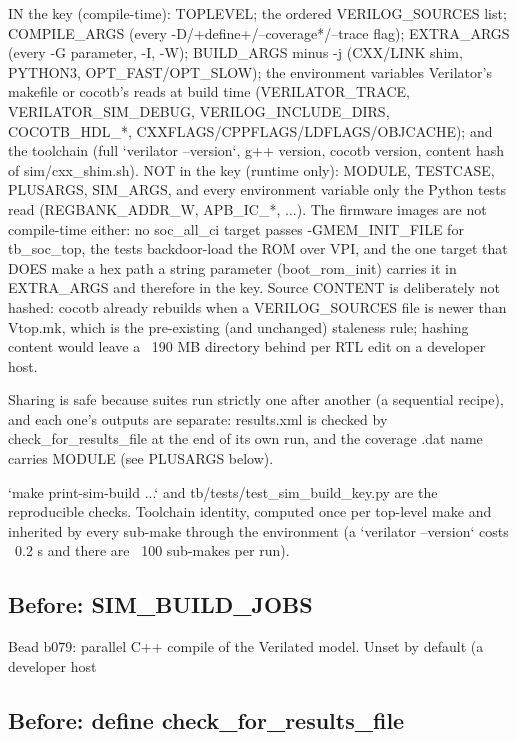 \begin{record}
\begin{textblock}
IN the key (compile-time): TOPLEVEL; the ordered VERILOG_SOURCES list; COMPILE_ARGS (every
  -D/+define+/--coverage*/--trace flag); EXTRA_ARGS (every -G parameter, -I, -W); BUILD_ARGS
  minus -j (CXX/LINK shim, PYTHON3, OPT_FAST/OPT_SLOW); the environment variables Verilator's
  makefile or cocotb's reads at build time (VERILATOR_TRACE, VERILATOR_SIM_DEBUG,
  VERILOG_INCLUDE_DIRS, COCOTB_HDL_*, CXXFLAGS/CPPFLAGS/LDFLAGS/OBJCACHE); and the toolchain
  (full `verilator --version`, g++ version, cocotb version, content hash of sim/cxx_shim.sh).
NOT in the key (runtime only): MODULE, TESTCASE, PLUSARGS, SIM_ARGS, and every environment
  variable only the Python tests read (REGBANK_ADDR_W, APB_IC_*, ...).  The firmware images are
  not compile-time either: no soc_all_ci target passes -GMEM_INIT_FILE for tb_soc_top, the tests
  backdoor-load the ROM over VPI, and the one target that DOES make a hex path a string
  parameter (boot_rom_init) carries it in EXTRA_ARGS and therefore in the key.
Source CONTENT is deliberately not hashed: cocotb already rebuilds when a VERILOG_SOURCES file
  is newer than Vtop.mk, which is the pre-existing (and unchanged) staleness rule; hashing
  content would leave a ~190 MB directory behind per RTL edit on a developer host.

Sharing is safe because suites run strictly one after another (a sequential recipe), and each
one's outputs are separate: results.xml is checked by check_for_results_file at the end of its
own run, and the coverage .dat name carries MODULE (see PLUSARGS below).

`make print-sim-build ...` and tb/tests/test_sim_build_key.py are the reproducible checks.
Toolchain identity, computed once per top-level make and inherited by every sub-make through
the environment (a `verilator --version` costs ~0.2 s and there are ~100 sub-makes per run).
\end{textblock}

\subsection*{Before: SIM\_BUILD\_JOBS}

\begin{textblock}
Bead b079: parallel C++ compile of the Verilated model.  Unset by default (a developer host
\end{textblock}

\subsection*{Before: define check\_for\_results\_file}


\end{record}
